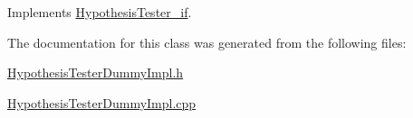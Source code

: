 Implements \hyperlink{class_hypothesis_tester__if_a28e2e287d35f6843a14bd2765b76b6bb}{Hypothesis\+Tester\+\_\+if}.



The documentation for this class was generated from the following files\+:\begin{DoxyCompactItemize}
\item 
\hyperlink{_hypothesis_tester_dummy_impl_8h}{Hypothesis\+Tester\+Dummy\+Impl.\+h}\item 
\hyperlink{_hypothesis_tester_dummy_impl_8cpp}{Hypothesis\+Tester\+Dummy\+Impl.\+cpp}\end{DoxyCompactItemize}
